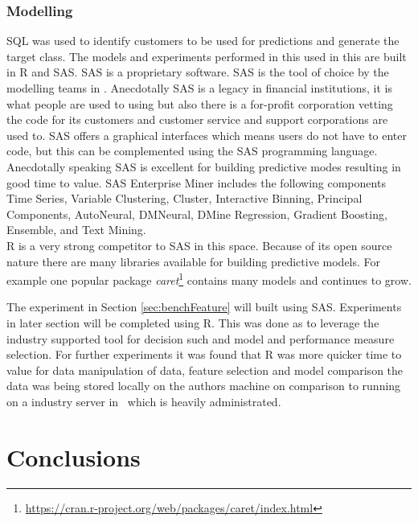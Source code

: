 \subsubsection{Modelling}
SQL was used to identify customers to be used for predictions and generate the target class.
The models and experiments performed in this used in this are built in R and SAS. SAS is a proprietary software. SAS is the tool of choice by the modelling teams in \subjectname. Anecdotally SAS is a legacy in financial institutions, it is what people are used to using but also there is a for-profit corporation vetting the code for its customers and customer service and support corporations are used to. SAS offers a graphical interfaces which means users do not have to enter code, but this can be complemented using the SAS programming language. Anecdotally speaking SAS is excellent for building predictive modes resulting in good time to value. SAS Enterprise Miner includes the following components Time Series, Variable Clustering, Cluster, Interactive Binning, Principal Components, AutoNeural, DMNeural, DMine Regression, Gradient Boosting, Ensemble, and Text Mining.
\\
R is a very strong competitor to SAS in this space. Because of its open source nature there are many libraries available for building predictive models. For example one popular package \textit{caret}\footnote{{\url{https://cran.r-project.org/web/packages/caret/index.html}}} contains many models and continues to grow.

The experiment in Section \ref{sec:benchFeature} will built using SAS. Experiments in later section will be completed using R. This was done as to leverage the industry supported tool for decision such and model and performance measure selection. For further experiments it was found that R was more quicker time to value for data manipulation of data, feature selection and model comparison the data was being stored locally on the authors machine on comparison to running on a industry server in \subjectname\ which is heavily administrated.  


\section{Conclusions}\label{desConc}


\begin{comment}
This chapter has discussed the processes required to carry out data mining techniques on non-relational web log data. The required data transformations have been discussed as well as the implemented methods for feature generation.
\end{comment}